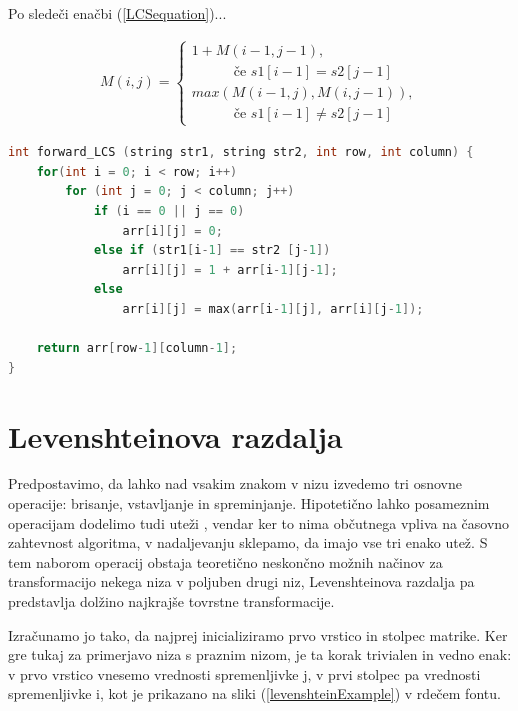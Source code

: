 \documentclass[a4paper,12pt,openright]{book}
\begin{document}
Po sledeči enačbi (\ref{LCSequation})...

\begin{equation}
\label{LCSequation}
\begin{aligned}
M(i, j) = 
\begin{cases}
     1 + M(i-1, j-1) ,      \\ \quad \quad \quad\text{če } s1[i-1]=s2[j-1]\\
     max(M(i-1, j), M(i, j-1)) , \\ \quad \quad \quad \text{če } s1[i-1] \neq s2[j-1]
  \end{cases}
\end{aligned}
\end{equation}

\begin{lstlisting}[language=C++, caption={Algoritem LCS naprej}, captionpos=b, label=LCSnaprej]
int forward_LCS (string str1, string str2, int row, int column) {
    for(int i = 0; i < row; i++) 
        for (int j = 0; j < column; j++) 
            if (i == 0 || j == 0)
                arr[i][j] = 0;
            else if (str1[i-1] == str2 [j-1])
                arr[i][j] = 1 + arr[i-1][j-1];
            else
                arr[i][j] = max(arr[i-1][j], arr[i][j-1]);

    return arr[row-1][column-1];
}
\end{lstlisting}

\section{Levenshteinova razdalja}

Predpostavimo, da lahko nad vsakim znakom v nizu izvedemo tri osnovne operacije: brisanje, vstavljanje in spreminjanje. Hipotetično lahko posameznim operacijam dodelimo tudi uteži \cite{weightedLevenshtein}, vendar ker to nima občutnega vpliva na časovno zahtevnost algoritma, v nadaljevanju sklepamo, da imajo vse tri enako utež. S tem naborom operacij obstaja teoretično neskončno možnih načinov za transformacijo nekega niza v poljuben drugi niz, Levenshteinova razdalja pa predstavlja dolžino najkrajše tovrstne transformacije. 

Izračunamo jo tako, da najprej inicializiramo prvo vrstico in stolpec matrike. Ker gre tukaj za primerjavo niza s praznim nizom, je ta korak trivialen in vedno enak: v prvo vrstico vnesemo vrednosti spremenljivke j, v prvi stolpec pa vrednosti spremenljivke i, kot je prikazano na sliki (\ref{levenshteinExample}) v rdečem fontu. 
\end{document}
